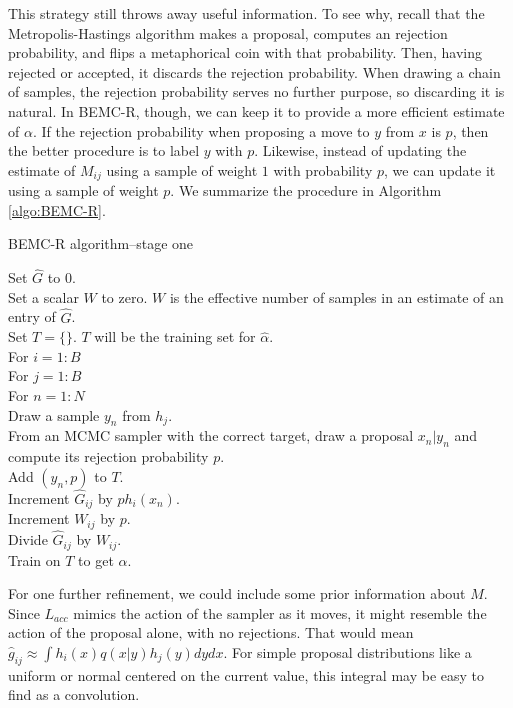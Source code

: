 \documentclass{article}
\newcommand\EMK[1]{\textcolor{purple}{EMK: #1}}
\begin{document}
This strategy still throws away useful information. To see why, recall that the Metropolis-Hastings algorithm makes a proposal, computes an rejection probability, and flips a metaphorical coin with that probability. Then, having rejected or accepted, it discards the rejection probability. When drawing a chain of samples, the rejection probability serves no further purpose, so discarding it is natural. In BEMC-R, though, we can keep it to provide a more efficient estimate of $\alpha$. If the rejection probability when proposing a move to $y$ from $x$ is $p$, then the better procedure is to label $y$ with $p$. Likewise, instead of updating the estimate of $M_{ij}$ using a sample of weight $1$ with probability $p$, we can update it using a sample of weight $p$. We summarize the procedure in Algorithm \ref{algo:BEMC-R}.

\begin{algorithm}[h]
\caption{BEMC-R algorithm--stage one \label{algo:BEMC-R}}
Set $\hat{G}$ to $0$.\\ 
Set a scalar $W$ to zero. $W$ is the effective number of samples in an estimate of an entry of $\hat{G}$.\\
Set $T = \{\}$. $T$ will be the training set for $\hat{\alpha}$.\\
For $i  = 1:B$\\
\Indp
For $j = 1:B$\\
\Indp
For $n = 1:N$\\
\Indp
Draw a sample $y_n$ from $h_{j}$.\\
From an MCMC sampler with the correct target, draw a proposal $x_n|y_n$ and compute its rejection probability $p$.\\
Add $(y_n, p)$ to $T$.\\
Increment $\hat{G}_{ij}$ by $ph_{i}(x_n)$.\\
Increment $W_{ij}$ by $p$.\\
\Indm
Divide $\hat{G}_{ij}$ by $W_{ij}$.\\
\Indm
\Indm
Train on $T$ to get $\hat{\alpha}$.%
\end{algorithm}

For one further refinement, we could include some prior information about $M$. Since $L_{acc}$ mimics the action of the sampler as it moves, it might resemble the action of the proposal alone, with no rejections. That would mean $\hat{g}_{ij} \approx \int h_i(x)q(x|y)h_j(y)dydx$. For simple proposal distributions like a uniform or normal centered on the current value, this integral may be easy to find as a convolution.
\end{document}
